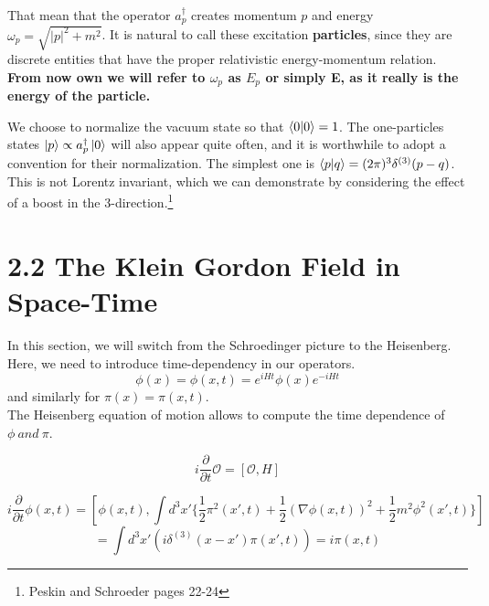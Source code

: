 \documentclass{article}
\newcommand{\A}{a^\dagger}
\begin{document}
That mean that the operator $\A_p$ creates momentum $p$ and energy\\ $\omega_p = \sqrt{|p|^2 +m^2}$.
It is natural to call these excitation \textbf{particles}, since they are discrete entities that have the proper relativistic energy-momentum relation.
\\
\textbf{From now own we will refer to $\omega_p$ as $E_p$ or simply E, as it really is the energy of the particle.}



We choose to normalize the vacuum state so that $\braket{0|0} = 1$. The one-particles states $\ket{p} \propto \A_p\ket{0}$ will also appear quite often, and it is worthwhile to adopt a convention for their normalization. The simplest one is $\braket{p|q} = (2\pi)^3 \delta^{(3)}(p-q)$. This is not Lorentz invariant, which we can demonstrate by considering the effect of a boost in the 3-direction.\footnote{Peskin and Schroeder pages 22-24}

\newpage

\section{2.2 The Klein Gordon Field in Space-Time}


In this section, we will switch from the Schroedinger picture to the Heisenberg.
Here, we need to introduce time-dependency in our operators.
\\
\begin{equation}
    \phi(x) = \phi(x,t) = e^{iHt}\phi(x)e^{-iHt}
\end{equation} and similarly for $\pi(x) = \pi(x,t)$.
\\
The Heisenberg equation of motion allows to compute the time dependence of $\phi \ and\ \pi$.

\begin{equation}
    i\frac{\partial}{\partial t}\mathcal{O} = [\mathcal{O},H]
\end{equation}

\begin{equation}
    i\frac{\partial}{\partial t}\phi(x,t) =[\phi(x,t),\int d^3x' \{ \frac{1}{2} \pi^2(x',t) + \frac{1}{2}(\nabla\phi(x,t))^2 + \frac{1}{2}m^2\phi^2(x',t)\}]
\end{equation}
\begin{equation*}
    = \int d^3x'(i\delta^{(3)}(x-x')\pi(x',t))=i\pi(x,t)
\end{equation*}
\end{document}
